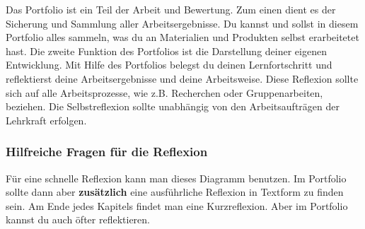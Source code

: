 \documentclass{scrartcl}  %
\begin{document}
						Das Portfolio ist ein Teil der Arbeit und Bewertung. Zum einen dient es der Sicherung und Sammlung aller Arbeitsergebnisse. Du kannst und sollst in diesem Portfolio alles sammeln, was du an Materialien und Produkten selbst erarbeitetet hast. 
						Die zweite Funktion des Portfolios ist die Darstellung deiner eigenen Entwicklung. Mit Hilfe des Portfolios belegst du deinen Lernfortschritt und reflektierst deine Arbeitsergebnisse und deine Arbeitsweise. Diese Reflexion sollte sich  auf alle Arbeitsprozesse, wie z.B. Recherchen oder Gruppenarbeiten, beziehen. Die Selbstreflexion sollte unabhängig von den Arbeitsaufträgen der Lehrkraft erfolgen.
			
					\subsubsection{Hilfreiche Fragen für die Reflexion}
			
						\begin{center}
						\end{center}
						
						\noindent Für eine schnelle Reflexion kann man dieses Diagramm benutzen. Im Portfolio sollte dann aber \textbf{zusätzlich} eine ausführliche Reflexion in Textform zu finden sein. Am Ende jedes Kapitels findet man eine Kurzreflexion. Aber im Portfolio kannst du auch öfter reflektieren. 
						
						
\end{document}
